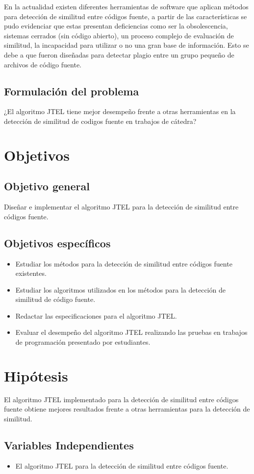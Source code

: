 En la actualidad existen diferentes herramientas de software que aplican métodos para detección de similitud entre códigos fuente, a partir de las características se pudo evidenciar que estas presentan deficiencias como ser la obsolescencia, sistemas cerrados (sin código abierto), un proceso complejo de evaluación de similitud, la incapacidad para utilizar o no una gran base de información. Esto se debe a que fueron diseñadas para detectar plagio entre un grupo pequeño de archivos de código fuente.
\subsection{Formulación del problema}
¿El algoritmo JTEL tiene mejor desempeño frente a otras herramientas en la detección de similitud de codigos fuente en trabajos de cátedra?

\section{Objetivos}
\subsection{Objetivo general}
Diseñar e implementar el algoritmo JTEL para la detección de similitud entre códigos fuente.
\subsection{Objetivos específicos}
\begin{itemize}
    \item Estudiar los métodos para la detección de similitud entre códigos fuente existentes.
    \item Estudiar los algoritmos utilizados en los métodos para la detección de similitud de código fuente.
    \item Redactar las especificaciones para el algoritmo JTEL.
    \item Evaluar el desempeño del algoritmo JTEL realizando las pruebas en trabajos de programación presentado por estudiantes.
\end{itemize}

\section{Hipótesis}
El algoritmo JTEL implementado para la detección de similitud entre códigos fuente obtiene mejores resultados frente a otras herramientas para la detección de similitud.
\subsection{Variables Independientes}
\begin{itemize}
    \item El algoritmo JTEL para la detección de similitud entre códigos fuente.
\end{itemize}
